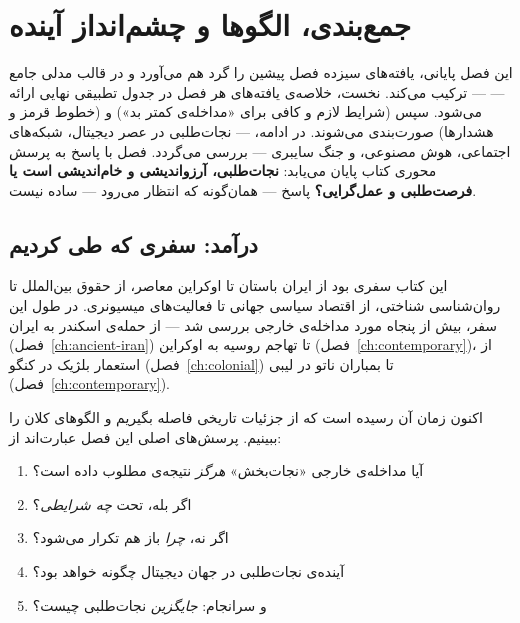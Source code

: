 \chapter{جمع‌بندی، الگوها و چشم‌انداز آینده}
\label{ch:conclusions}

\begin{tcolorbox}[mybox, title={چکیده‌ی فصل}]
این فصل پایانی، یافته‌های سیزده فصل پیشین را گرد هم می‌آورد و در قالب مدلی جامع —  — ترکیب می‌کند. نخست، خلاصه‌ی یافته‌های هر فصل در جدول تطبیقی نهایی ارائه می‌شود. سپس  (شرایط لازم و کافی برای «مداخله‌ی کمتر بد») و  (خطوط قرمز و هشدارها) صورت‌بندی می‌شوند. در ادامه،  — نجات‌طلبی در عصر دیجیتال، شبکه‌های اجتماعی، هوش مصنوعی، و جنگ سایبری — بررسی می‌گردد. فصل با پاسخ به پرسش محوری کتاب پایان می‌یابد: \textbf{نجات‌طلبی، آرزواندیشی و خام‌اندیشی است یا فرصت‌طلبی و عمل‌گرایی؟} پاسخ — همان‌گونه که انتظار می‌رود — ساده نیست.
\end{tcolorbox}

\section{درآمد: سفری که طی کردیم}
\label{sec:ch14-intro}

این کتاب سفری بود از ایران باستان تا اوکراین معاصر، از حقوق بین‌الملل تا روان‌شناسی شناختی، از اقتصاد سیاسی جهانی تا فعالیت‌های میسیونری. در طول این سفر، بیش از پنجاه مورد مداخله‌ی خارجی بررسی شد — از حمله‌ی اسکندر به ایران (فصل~\ref{ch:ancient-iran}) تا تهاجم روسیه به اوکراین (فصل~\ref{ch:contemporary})، از استعمار بلژیک در کنگو (فصل~\ref{ch:colonial}) تا بمباران ناتو در لیبی (فصل~\ref{ch:contemporary}).

اکنون زمان آن رسیده است که از جزئیات تاریخی فاصله بگیریم و الگوهای کلان را ببینیم. پرسش‌های اصلی این فصل عبارت‌اند از:

\begin{enumerate}
\item آیا مداخله‌ی خارجی «نجات‌بخش» \textit{هرگز} نتیجه‌ی مطلوب داده است؟
\item اگر بله، تحت \textit{چه شرایطی}؟
\item اگر نه، \textit{چرا} باز هم تکرار می‌شود؟
\item آینده‌ی نجات‌طلبی در جهان دیجیتال چگونه خواهد بود؟
\item و سرانجام: \textit{جایگزین} نجات‌طلبی چیست؟
\end{enumerate}


